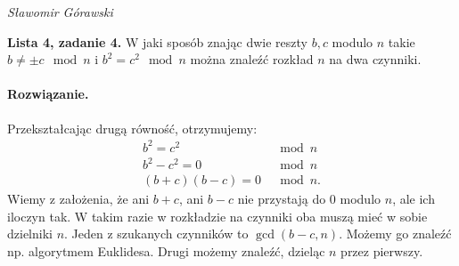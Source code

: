 \documentclass{article}
\begin{document}
\begin{flushright}
\textit{Sławomir Górawski}
\end{flushright}
\bigskip

\noindent\textbf{Lista 4, zadanie 4.}
W jaki sposób znając dwie reszty $b, c$ modulo $n$
takie $b \ne \pm c \mod n$ i $b^2 = c^2 \mod n$
można znaleźć rozkład $n$ na dwa czynniki.

\paragraph{Rozwiązanie.}
Przekształcając drugą równość, otrzymujemy:
\begin{align*}
    b^2 = c^2 &\mod n \\
    b^2 - c^2 = 0 &\mod n \\
    (b + c)(b - c) = 0 &\mod n.
\end{align*}
Wiemy z założenia, że ani $b + c$, ani $b - c$ nie przystają do 0 modulo $n$, ale ich iloczyn tak.
W takim razie w rozkładzie na czynniki oba muszą mieć w sobie dzielniki $n$.
Jeden z szukanych czynników to $\gcd(b - c, n)$.
Możemy go znaleźć np. algorytmem Euklidesa.
Drugi możemy znaleźć, dzieląc $n$ przez pierwszy.
\end{document}
